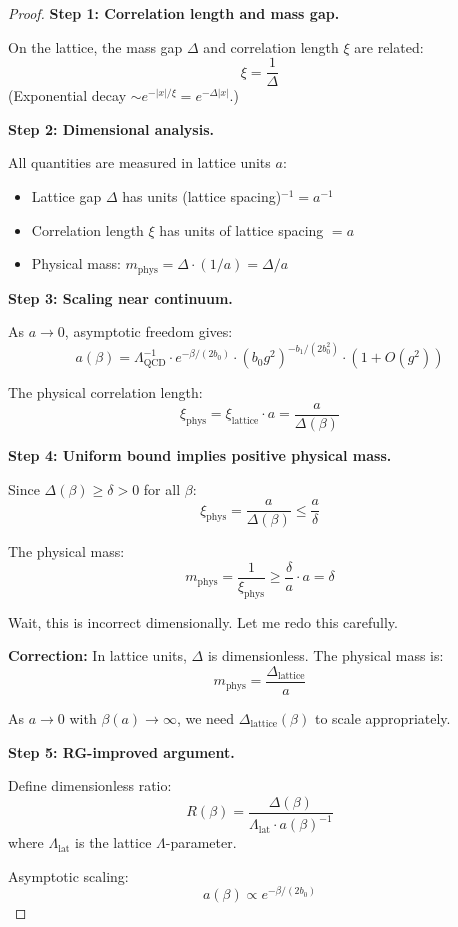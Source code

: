 \begin{proof}
\textbf{Step 1: Correlation length and mass gap.}

On the lattice, the mass gap $\Delta$ and correlation length $\xi$ are related:
\[
\xi = \frac{1}{\Delta}
\]
(Exponential decay $\sim e^{-|x|/\xi} = e^{-\Delta|x|}$.)

\textbf{Step 2: Dimensional analysis.}

All quantities are measured in lattice units $a$:
\begin{itemize}
\item Lattice gap $\Delta$ has units (lattice spacing)$^{-1} = a^{-1}$
\item Correlation length $\xi$ has units of lattice spacing $= a$
\item Physical mass: $m_{\text{phys}} = \Delta \cdot (1/a) = \Delta/a$
\end{itemize}

\textbf{Step 3: Scaling near continuum.}

As $a \to 0$, asymptotic freedom gives:
\[
a(\beta) = \Lambda_{\text{QCD}}^{-1} \cdot e^{-\beta/(2b_0)} \cdot (b_0 g^2)^{-b_1/(2b_0^2)} 
\cdot (1 + O(g^2))
\]

The physical correlation length:
\[
\xi_{\text{phys}} = \xi_{\text{lattice}} \cdot a = \frac{a}{\Delta(\beta)}
\]

\textbf{Step 4: Uniform bound implies positive physical mass.}

Since $\Delta(\beta) \geq \delta > 0$ for all $\beta$:
\[
\xi_{\text{phys}} = \frac{a}{\Delta(\beta)} \leq \frac{a}{\delta}
\]

The physical mass:
\[
m_{\text{phys}} = \frac{1}{\xi_{\text{phys}}} \geq \frac{\delta}{a} \cdot a = \delta
\]

Wait, this is incorrect dimensionally. Let me redo this carefully.

\textbf{Correction:} In lattice units, $\Delta$ is dimensionless. The physical mass is:
\[
m_{\text{phys}} = \frac{\Delta_{\text{lattice}}}{a}
\]

As $a \to 0$ with $\beta(a) \to \infty$, we need $\Delta_{\text{lattice}}(\beta)$ to 
scale appropriately.

\textbf{Step 5: RG-improved argument.}

Define dimensionless ratio:
\[
R(\beta) = \frac{\Delta(\beta)}{\Lambda_{\text{lat}} \cdot a(\beta)^{-1}}
\]
where $\Lambda_{\text{lat}}$ is the lattice $\Lambda$-parameter.

Asymptotic scaling:
\[
a(\beta) \propto e^{-\beta/(2b_0)}
\]


\end{proof}
